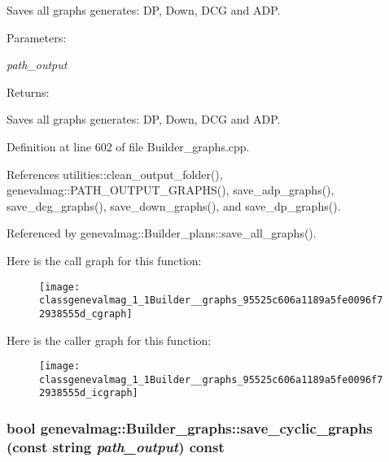 Saves all graphs generates: DP, Down, DCG and ADP. \begin{Desc}
\item[Parameters:]
\begin{description}
\item[{\em path\_\-output}]\end{description}
\end{Desc}
\begin{Desc}
\item[Returns:]\end{Desc}
Saves all graphs generates: DP, Down, DCG and ADP. 

Definition at line 602 of file Builder\_\-graphs.cpp.

References utilities::clean\_\-output\_\-folder(), genevalmag::PATH\_\-OUTPUT\_\-GRAPHS(), save\_\-adp\_\-graphs(), save\_\-dcg\_\-graphs(), save\_\-down\_\-graphs(), and save\_\-dp\_\-graphs().

Referenced by genevalmag::Builder\_\-plans::save\_\-all\_\-graphs().

Here is the call graph for this function:\nopagebreak
\begin{figure}[H]
\begin{center}
\leavevmode
\texttt{[image: classgenevalmag\_1\_1Builder\_\_graphs\_95525c606a1189a5fe0096f72938555d\_cgraph]}
\end{center}
\end{figure}


Here is the caller graph for this function:\nopagebreak
\begin{figure}[H]
\begin{center}
\leavevmode
\texttt{[image: classgenevalmag\_1\_1Builder\_\_graphs\_95525c606a1189a5fe0096f72938555d\_icgraph]}
\end{center}
\end{figure}
\hypertarget{classgenevalmag_1_1Builder__graphs_81bf79709c133320f4d40cdee1f61466}{
\subsubsection[{save\_\-cyclic\_\-graphs}]{\setlength{\rightskip}{0pt plus 5cm}bool genevalmag::Builder\_\-graphs::save\_\-cyclic\_\-graphs (const string {\em path\_\-output}) const}}
\label{classgenevalmag_1_1Builder__graphs_81bf79709c133320f4d40cdee1f61466}


